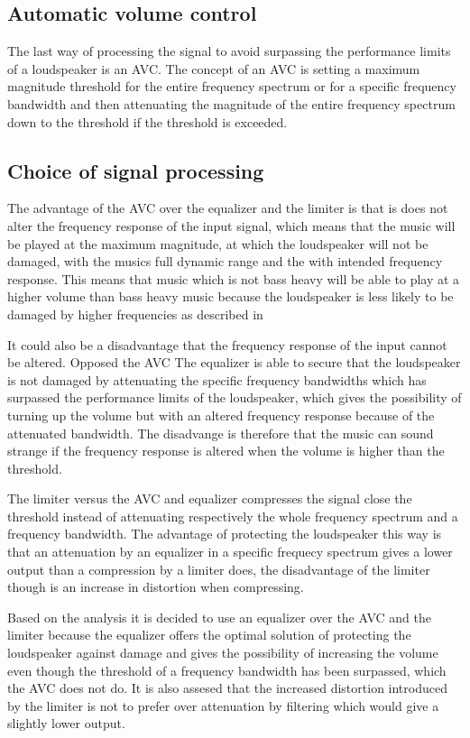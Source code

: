 \subsection*{Automatic volume control}
The last way of processing the signal to avoid surpassing the performance limits of a loudspeaker is an \gls{AVC}. The concept of an AVC is setting a maximum magnitude threshold for the entire frequency spectrum or for a specific frequency bandwidth and then attenuating the magnitude of the entire frequency spectrum down to the threshold if the threshold is exceeded.

\subsection*{Choice of signal processing}
The advantage of the AVC over the equalizer and the limiter is that is does not alter the frequency response of the input signal, which means that the music will be played at the maximum magnitude, at which the loudspeaker will not be damaged, with the musics full dynamic range and the with intended frequency response. This means that music which is not bass heavy will be able to play at a higher volume than bass heavy music because the loudspeaker is less likely to be damaged by higher frequencies as described in 

It could also be a disadvantage that the frequency response of the input cannot be altered. Opposed the AVC The equalizer is able to secure that the loudspeaker is not damaged by attenuating the specific frequency bandwidths which has surpassed the performance limits of the loudspeaker, which gives the possibility of turning up the volume but with an altered frequency response because of the attenuated bandwidth. The disadvange is therefore that the music can sound strange if the frequency response is altered when the volume is higher than the threshold.

The limiter versus the AVC and equalizer compresses the signal close the threshold instead of attenuating respectively the whole frequency spectrum and a frequency bandwidth. The advantage of protecting the loudspeaker this way is that an attenuation by an equalizer in a specific frequecy spectrum gives a lower output than a compression by a limiter does, the disadvantage of the limiter though is an increase in distortion when compressing. 

Based on the analysis it is decided to use an equalizer over the AVC and the limiter because the equalizer offers the optimal solution of protecting the loudspeaker against damage and gives the possibility of increasing the volume even though the threshold of a frequency bandwidth has been surpassed, which the AVC does not do. It is also assesed that the increased distortion introduced by the limiter is not to prefer over attenuation by filtering which would give a slightly lower output.  


      